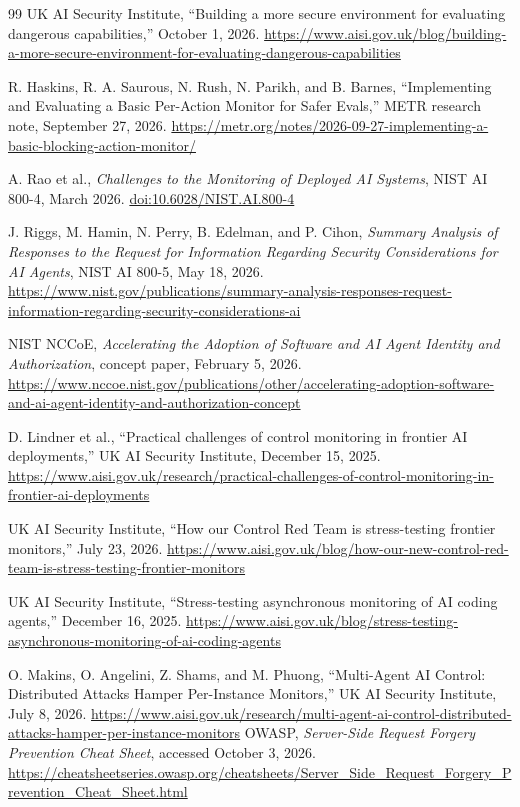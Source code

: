 \documentclass[11pt,letterpaper]{article}
\newcommand{\doiurl}[1]{\href{https://doi.org/#1}{doi:#1}}
\begin{document}
\begin{thebibliography}{99}
 UK AI Security Institute, ``Building a more secure environment for evaluating dangerous capabilities,'' October 1, 2026. \url{https://www.aisi.gov.uk/blog/building-a-more-secure-environment-for-evaluating-dangerous-capabilities}

 R. Haskins, R. A. Saurous, N. Rush, N. Parikh, and B. Barnes, ``Implementing and Evaluating a Basic Per-Action Monitor for Safer Evals,'' METR research note, September 27, 2026. \url{https://metr.org/notes/2026-09-27-implementing-a-basic-blocking-action-monitor/}

 A. Rao et al., \emph{Challenges to the Monitoring of Deployed AI Systems}, NIST AI 800-4, March 2026. \doiurl{10.6028/NIST.AI.800-4}

 J. Riggs, M. Hamin, N. Perry, B. Edelman, and P. Cihon, \emph{Summary Analysis of Responses to the Request for Information Regarding Security Considerations for AI Agents}, NIST AI 800-5, May 18, 2026. \url{https://www.nist.gov/publications/summary-analysis-responses-request-information-regarding-security-considerations-ai}

 NIST NCCoE, \emph{Accelerating the Adoption of Software and AI Agent Identity and Authorization}, concept paper, February 5, 2026. \url{https://www.nccoe.nist.gov/publications/other/accelerating-adoption-software-and-ai-agent-identity-and-authorization-concept}

 D. Lindner et al., ``Practical challenges of control monitoring in frontier AI deployments,'' UK AI Security Institute, December 15, 2025. \url{https://www.aisi.gov.uk/research/practical-challenges-of-control-monitoring-in-frontier-ai-deployments}

 UK AI Security Institute, ``How our Control Red Team is stress-testing frontier monitors,'' July 23, 2026. \url{https://www.aisi.gov.uk/blog/how-our-new-control-red-team-is-stress-testing-frontier-monitors}

 UK AI Security Institute, ``Stress-testing asynchronous monitoring of AI coding agents,'' December 16, 2025. \url{https://www.aisi.gov.uk/blog/stress-testing-asynchronous-monitoring-of-ai-coding-agents}

 O. Makins, O. Angelini, Z. Shams, and M. Phuong, ``Multi-Agent AI Control: Distributed Attacks Hamper Per-Instance Monitors,'' UK AI Security Institute, July 8, 2026. \url{https://www.aisi.gov.uk/research/multi-agent-ai-control-distributed-attacks-hamper-per-instance-monitors}
 OWASP, \emph{Server-Side Request Forgery Prevention Cheat Sheet}, accessed October 3, 2026. \url{https://cheatsheetseries.owasp.org/cheatsheets/Server_Side_Request_Forgery_Prevention_Cheat_Sheet.html}


\end{thebibliography}
\end{document}
